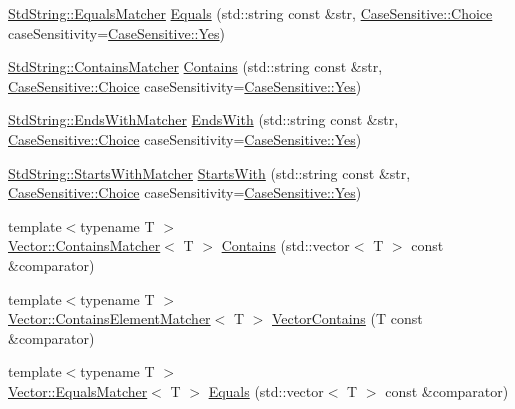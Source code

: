\begin{DoxyCompactItemize}
\item 
\hyperlink{struct_catch_1_1_matchers_1_1_std_string_1_1_equals_matcher}{Std\-String\-::\-Equals\-Matcher} \hyperlink{namespace_catch_1_1_matchers_af8af7dfc338335ed4c788cb1b37fc59f}{Equals} (std\-::string const \&str, \hyperlink{struct_catch_1_1_case_sensitive_aad49d3aee2d97066642fffa919685c6a}{Case\-Sensitive\-::\-Choice} case\-Sensitivity=\hyperlink{struct_catch_1_1_case_sensitive_aad49d3aee2d97066642fffa919685c6aa7c5550b69ec3c502e6f609b67f9613c6}{Case\-Sensitive\-::\-Yes})
\item 
\hyperlink{struct_catch_1_1_matchers_1_1_std_string_1_1_contains_matcher}{Std\-String\-::\-Contains\-Matcher} \hyperlink{namespace_catch_1_1_matchers_a1f6c2accdc6cd75a84d7112dcad647b4}{Contains} (std\-::string const \&str, \hyperlink{struct_catch_1_1_case_sensitive_aad49d3aee2d97066642fffa919685c6a}{Case\-Sensitive\-::\-Choice} case\-Sensitivity=\hyperlink{struct_catch_1_1_case_sensitive_aad49d3aee2d97066642fffa919685c6aa7c5550b69ec3c502e6f609b67f9613c6}{Case\-Sensitive\-::\-Yes})
\item 
\hyperlink{struct_catch_1_1_matchers_1_1_std_string_1_1_ends_with_matcher}{Std\-String\-::\-Ends\-With\-Matcher} \hyperlink{namespace_catch_1_1_matchers_ae5a45efb4538c57c43e04f3f9043ad6e}{Ends\-With} (std\-::string const \&str, \hyperlink{struct_catch_1_1_case_sensitive_aad49d3aee2d97066642fffa919685c6a}{Case\-Sensitive\-::\-Choice} case\-Sensitivity=\hyperlink{struct_catch_1_1_case_sensitive_aad49d3aee2d97066642fffa919685c6aa7c5550b69ec3c502e6f609b67f9613c6}{Case\-Sensitive\-::\-Yes})
\item 
\hyperlink{struct_catch_1_1_matchers_1_1_std_string_1_1_starts_with_matcher}{Std\-String\-::\-Starts\-With\-Matcher} \hyperlink{namespace_catch_1_1_matchers_a97c9ee09a70378ca7e8c6f9f01b0d6d1}{Starts\-With} (std\-::string const \&str, \hyperlink{struct_catch_1_1_case_sensitive_aad49d3aee2d97066642fffa919685c6a}{Case\-Sensitive\-::\-Choice} case\-Sensitivity=\hyperlink{struct_catch_1_1_case_sensitive_aad49d3aee2d97066642fffa919685c6aa7c5550b69ec3c502e6f609b67f9613c6}{Case\-Sensitive\-::\-Yes})
\item 
{\footnotesize template$<$typename T $>$ }\\\hyperlink{struct_catch_1_1_matchers_1_1_vector_1_1_contains_matcher}{Vector\-::\-Contains\-Matcher}$<$ T $>$ \hyperlink{namespace_catch_1_1_matchers_a4b3621740dc515216ad31ab827d4092c}{Contains} (std\-::vector$<$ T $>$ const \&comparator)
\item 
{\footnotesize template$<$typename T $>$ }\\\hyperlink{struct_catch_1_1_matchers_1_1_vector_1_1_contains_element_matcher}{Vector\-::\-Contains\-Element\-Matcher}$<$ T $>$ \hyperlink{namespace_catch_1_1_matchers_ae8db5846328116fb36386893deaec944}{Vector\-Contains} (T const \&comparator)
\item 
{\footnotesize template$<$typename T $>$ }\\\hyperlink{struct_catch_1_1_matchers_1_1_vector_1_1_equals_matcher}{Vector\-::\-Equals\-Matcher}$<$ T $>$ \hyperlink{namespace_catch_1_1_matchers_a332a401fb0da33c988e9cfa400ecce1b}{Equals} (std\-::vector$<$ T $>$ const \&comparator)
\end{DoxyCompactItemize}


